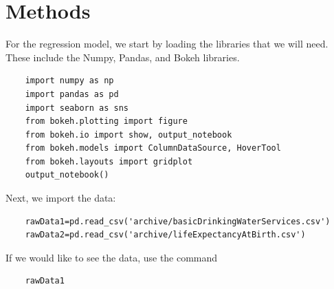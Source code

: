\documentclass[12pt]{article}
\begin{document}
\section{Methods}

For the regression model, we start by loading the libraries that we will need. These include the Numpy, Pandas, and Bokeh libraries.

\begin{verbatim}
    import numpy as np
    import pandas as pd
    import seaborn as sns
    from bokeh.plotting import figure
    from bokeh.io import show, output_notebook
    from bokeh.models import ColumnDataSource, HoverTool
    from bokeh.layouts import gridplot
    output_notebook()
\end{verbatim}

Next, we import the data:
\begin{verbatim}
    rawData1=pd.read_csv('archive/basicDrinkingWaterServices.csv')
    rawData2=pd.read_csv('archive/lifeExpectancyAtBirth.csv')
\end{verbatim}

If we would like to see the data, use the command
\begin{verbatim}
    rawData1
\end{verbatim}
\end{document}
